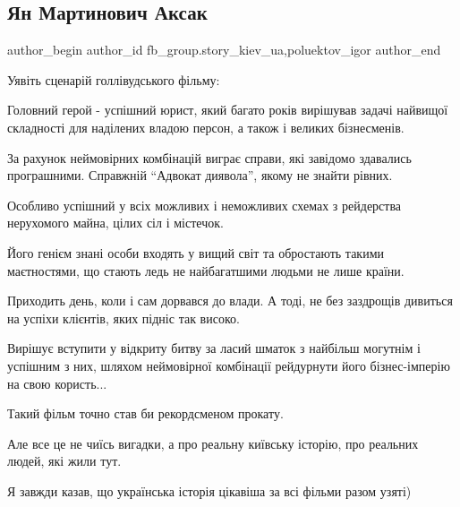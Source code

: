  
 
 
 
 
 
\subsection{Ян Мартинович Аксак}
\label{sec:30_11_2021.fb.fb_group.story_kiev_ua.2.aksak}
 
\ifcmt
 author_begin
   author_id fb_group.story_kiev_ua,poluektov_igor
 author_end
\fi

Уявіть сценарій голлівудського фільму:

Головний герой - успішний юрист, який багато років вирішував задачі найвищої
складності для наділених владою персон, а також і великих бізнесменів.


За рахунок неймовірних комбінацій виграє справи, які завідомо здавались
програшними. Справжній \enquote{Адвокат диявола}, якому не знайти рівних.

Особливо успішний у всіх можливих і неможливих схемах з рейдерства нерухомого
майна, цілих сіл і містечок.

Його генієм знані особи входять у вищий світ та обростають такими маєтностями,
що стають ледь не найбагатшими людьми не лише країни.

Приходить день, коли і сам дорвався до влади. А тоді, не без заздрощів дивиться
на успіхи клієнтів, яких підніс так високо. 

Вирішує вступити у відкриту битву за ласий шматок з найбільш могутнім і
успішним з них, шляхом неймовірної комбінації рейдурнути його бізнес-імперію на
свою користь...

Такий фільм точно став би рекордсменом прокату.

Але все це не чиїсь вигадки, а про реальну київську історію, про реальних
людей, які жили тут.

Я завжди казав, що українська історія цікавіша за всі фільми разом узяті)

